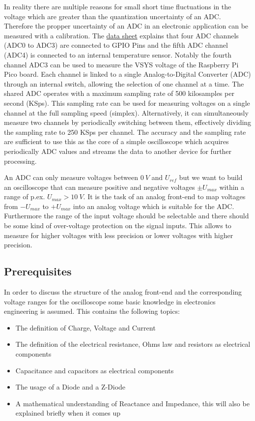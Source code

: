 In reality there are multiple reasons for small short time fluctuations in the voltage which are greater than the quantization uncertainty of an ADC. Therefore the propper uncertainty of an ADC in an electronic application can be measured with a calibration.
The \href{https://datasheets.raspberrypi.com/rp2040/rp2040-datasheet.pdf}{data sheet} explains that four ADC channels (ADC0 to ADC3) are connected to GPIO Pins and the fifth ADC channel (ADC4) is connected to an internal temperature sensor. Notably the fourth channel ADC3 can be used to measure the VSYS voltage of the Raspberry Pi Pico board.
Each channel is linked to a single Analog-to-Digital Converter (ADC) through an internal switch, allowing the selection of one channel at a time. The shared ADC operates with a maximum sampling rate of 500 kilosamples per second (KSps). This sampling rate can be used for measuring voltages on a single channel at the full sampling speed (simplex). Alternatively, it can simultaneously measure two channels by periodically switching between them, effectively dividing the sampling rate to 250 KSps per channel. The accuracy and the sampling rate are sufficient to use this as the core of a simple oscilloscope which acquires periodically ADC values and streams the data to another device for further processing.

An ADC can only measure voltages between $\SI{0}{V}$ and $U_{ref}$ but we want to build an oscilloscope that can measure positive and negative voltages $\pm{}U_{max}$ within a range of p.ex. $U_{max} > \SI{10}{V}$. It is the task of an analog front-end to map voltages from $-U_{max}$ to $+U_{max}$ into an analog voltage which is suitable for the ADC. Furthermore the range of the input voltage should be selectable and there should be some kind of over-voltage protection on the signal inputs. This allows to measure for higher voltages with less precision or lower voltages with higher precision.

\subsection{Prerequisites}

In order to discuss the structure of the analog front-end and the corresponding voltage ranges for the oscilloscope some basic knowledge in electronics engineering is assumed. This contains the following topics:

\begin{itemize}
	\item The definition of Charge, Voltage and Current
	\item The definition of the electrical resistance, Ohms law and resistors as electrical components
	\item Capacitance and capacitors as electrical components
	\item The usage of a Diode and a Z-Diode
	\item A mathematical understanding of Reactance and Impedance, this will also be explained briefly when it comes up
\end{itemize}

